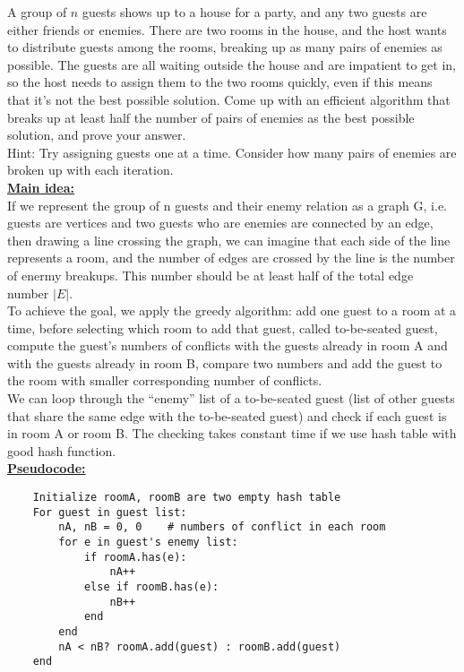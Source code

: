 \documentclass{article}\usepackage[utf8]{inputenc}
\begin{document}
\noindent A group of $n$ guests shows up to a house for a party, and any two guests are either friends or enemies. There are two rooms in the house, and the host wants to distribute guests among the rooms, breaking up as many pairs of enemies as possible. The guests are all waiting outside the house and are impatient to get in, so the host needs to assign them to the two rooms quickly, even if this means that it's not the best possible solution. Come up with an efficient algorithm that breaks up at least half the number of pairs of enemies as the best possible solution, and prove your answer.\\
Hint: Try assigning guests one at a time. Consider how many pairs of enemies are broken up with each iteration.
\BeginSolution %
\\
\underline{\textbf{Main idea:}}\\
If we represent the group of n guests and their enemy relation as a graph G, i.e. guests are vertices and two guests who are enemies are connected by an edge, then drawing a line crossing the graph, we can imagine that each side of the line represents a room, and the number of edges are crossed by the line is the number of enermy breakups. This number should be at least half of the total edge number $|E|$.\\
To achieve the goal, we apply the greedy algorithm: add one guest to a room at a time, before selecting which room to add that guest, called to-be-seated guest, compute the guest's numbers of conflicts with the guests already in room A and with the guests already in room B, compare two numbers and add the guest to the room with smaller corresponding number of conflicts.\\
We can loop through the ``enemy'' list of a to-be-seated guest (list of other guests that share the same edge with the to-be-seated guest) and check if each guest is in room A or room B. The checking takes constant time if we use hash table with good hash function.\\
\underline{\textbf{Pseudocode:}}
%
\begin{lstlisting}
    Initialize roomA, roomB are two empty hash table
    For guest in guest list:
        nA, nB = 0, 0    # numbers of conflict in each room
        for e in guest's enemy list:
            if roomA.has(e):
                nA++
            else if roomB.has(e):
                nB++
            end
        end
        nA < nB? roomA.add(guest) : roomB.add(guest)
    end
\end{lstlisting}
\end{document}
